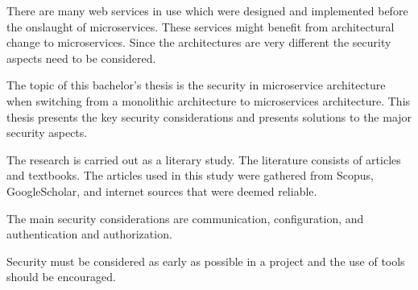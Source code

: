 \begin{enabstract}
    \begin{sloppypar}
        There are many web services in use which were designed and implemented 
        before the onslaught of microservices. These services might benefit 
        from architectural change to microservices. Since the architectures
        are very different the security aspects need to be considered.
    \end{sloppypar}
    \begin{sloppypar}    
        The topic of this bachelor's thesis is the security in microservice 
        architecture when switching from a monolithic architecture to 
        microservices architecture. This thesis presents the key security 
        considerations and presents solutions to the major security aspects.
    \end{sloppypar}
    \begin{sloppypar}
        The research is carried out as a literary study.
        The literature consists of articles and textbooks.
        The articles used in this study were gathered from Scopus, 
        GoogleScholar, and internet sources that were deemed reliable.
    \end{sloppypar}
    \begin{sloppypar}
        The main security considerations are communication, configuration, 
        and authentication and authorization. 
    \end{sloppypar}
    \begin{sloppypar}
        Security must be considered as early as possible in a project 
        and the use of tools should be encouraged.
    \end{sloppypar}
\end{enabstract}
